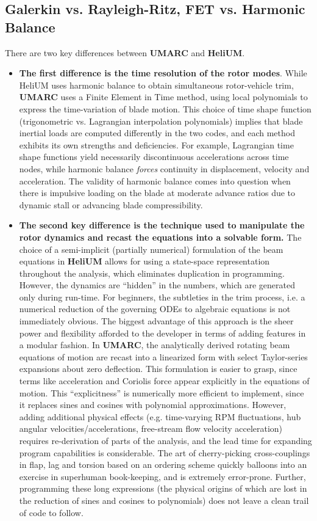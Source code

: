 \subsection{\textbf{Galerkin vs. Rayleigh-Ritz, FET vs. Harmonic Balance}}
There are two key differences between \textbf{UMARC} and \textbf{HeliUM}. 
\begin{itemize}
\item \textbf{The first difference is the time resolution of the rotor modes}. While HeliUM uses harmonic balance to obtain simultaneous rotor-vehicle trim, \textbf{UMARC} uses a Finite Element in Time method, using local polynomials to express the time-variation of blade motion. This choice of time shape function (trigonometric vs. Lagrangian interpolation polynomials) implies that blade inertial loads are computed differently in the two codes, and each method exhibits its own strengths and deficiencies. For example, Lagrangian time shape functions yield necessarily discontinuous accelerations across time nodes, while harmonic balance \textit{forces} continuity in displacement, velocity and acceleration. The validity of harmonic balance comes into question when there is impulsive loading on the blade at moderate advance ratios due to dynamic stall or advancing blade compressibility.
\item \textbf{The second key difference is the technique used to manipulate the rotor dynamics and recast the equations into a solvable form.} The choice of a semi-implicit (partially numerical) formulation of the beam equations in \textbf{HeliUM} allows for using a state-space representation throughout the analysis, which eliminates duplication in programming. However, the dynamics are ``hidden'' in the numbers, which are generated only during run-time. For beginners, the subtleties in the trim process, i.e. a numerical reduction of the governing ODEs to algebraic equations is not immediately obvious. The biggest advantage of this approach is the sheer power and flexibility afforded to the developer in terms of adding features in a modular fashion. In \textbf{UMARC}, the analytically derived rotating beam equations of motion are recast into a linearized form with select Taylor-series expansions about zero deflection. This formulation is easier to grasp, since terms like acceleration and Coriolis force appear explicitly in the equations of motion. This ``explicitness'' is numerically more efficient to implement, since it replaces sines and cosines with polynomial approximations. However, adding additional physical effects (e.g. time-varying RPM fluctuations, hub angular velocities/accelerations, free-stream flow velocity acceleration) requires re-derivation of parts of the analysis, and the lead time for expanding program capabilities is considerable. The art of cherry-picking cross-couplings in flap, lag and torsion based on an ordering scheme quickly balloons into an exercise in superhuman book-keeping, and is extremely error-prone. Further, programming these long expressions (the physical origins of which are lost in the reduction of sines and cosines to polynomials) does not leave a clean trail of code to follow. 
\end{itemize}

